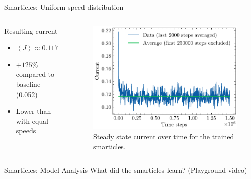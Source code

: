 \documentclass[10pt,xcolor=table, aspectratio=1610]{beamer}
\begin{document}
\begin{frame}{Smarticles: Uniform speed distribution}
  \begin{columns}
    \begin{block}{Resulting current}
      \begin{itemize}
        \item $\left\langle J \right\rangle \approx 0.117$
        \item $+125\%$ compared to baseline (0.052)
        \item Lower than with equal speeds
      \end{itemize}
    \end{block}
    \begin{figure}
        \includegraphics[width=\textwidth]{../Thesis/img/results/uniform_speeds.pdf}
        \caption*{Steady state current over time for the trained smarticles.}
      \end{figure}
  \end{columns}
\end{frame}

\begin{frame}{Smarticles: Model Analysis}
  What did the smarticles learn? (Playground video)
\end{frame}
\end{document}
